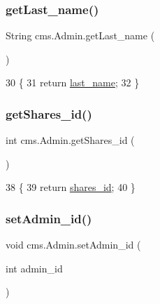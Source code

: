 \subsubsection{\texorpdfstring{get\+Last\+\_\+name()}{getLast\_name()}}
{\footnotesize\ttfamily String cms.\+Admin.\+get\+Last\+\_\+name (\begin{DoxyParamCaption}{ }\end{DoxyParamCaption})\hspace{0.3cm}{\ttfamily [inline]}}


\begin{DoxyCode}
30                                  \{
31         \textcolor{keywordflow}{return} \mbox{\hyperlink{classcms_1_1_admin_abe31ed0d83c09185e6e4f6c1a3d3c685}{last\_name}};
32     \}
\end{DoxyCode}
\mbox{\label{classcms_1_1_admin_a589025775cbda46a854d957aec6e1d83}} 
\subsubsection{\texorpdfstring{get\+Shares\+\_\+id()}{getShares\_id()}}
{\footnotesize\ttfamily int cms.\+Admin.\+get\+Shares\+\_\+id (\begin{DoxyParamCaption}{ }\end{DoxyParamCaption})\hspace{0.3cm}{\ttfamily [inline]}}


\begin{DoxyCode}
38                               \{
39         \textcolor{keywordflow}{return} \mbox{\hyperlink{classcms_1_1_admin_a1f31a081502c0d05fef837eb1b36b157}{shares\_id}};
40     \}
\end{DoxyCode}
\mbox{\label{classcms_1_1_admin_a898049bf40a6dd20992f6e271cdfdccf}} 
\subsubsection{\texorpdfstring{set\+Admin\+\_\+id()}{setAdmin\_id()}}
{\footnotesize\ttfamily void cms.\+Admin.\+set\+Admin\+\_\+id (\begin{DoxyParamCaption}\item[{int}]{admin\+\_\+id }\end{DoxyParamCaption})\hspace{0.3cm}{\ttfamily [inline]}}


